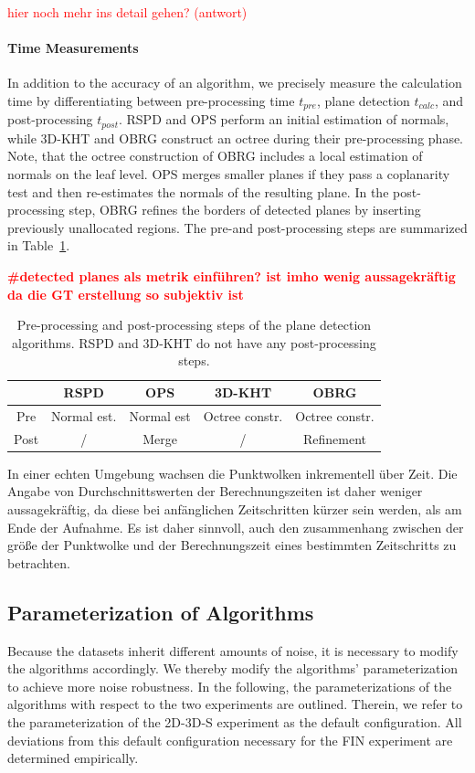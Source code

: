 \documentclass[main.tex]{subfiles}
\begin{document}
\textcolor{red}{hier noch mehr ins detail gehen? (antwort) \underline{\hspace{2cm}}}

\paragraph{Time Measurements}
\label{par:time}
In addition to the accuracy of an algorithm, we precisely measure the calculation time by differentiating between pre-processing time $t_{pre}$, 
plane detection $t_{calc}$, and post-processing $t_{post}$.
RSPD and OPS perform an initial estimation of normals, while 3D-KHT and OBRG construct an octree during their
pre-processing phase. Note, that the octree construction of OBRG includes a local estimation of normals on the
leaf level. OPS merges smaller planes if they pass a coplanarity test and then re-estimates the normals of the
resulting plane. In the post-processing step, OBRG refines the borders of detected planes by inserting
previously unallocated regions.
The pre-and post-processing steps are summarized in Table~\ref{tab:pre-post}.

\textbf{\textcolor{red}{\#detected planes als metrik einführen? ist imho wenig aussagekräftig da die GT erstellung so subjektiv ist}}

\begin{table}[H]
    \centering
    \begin{tabular}{c|cccc}
             & RSPD        & OPS        & 3D-KHT         & OBRG           \\ \hline
        Pre  & Normal est. & Normal est & Octree constr. & Octree constr. \\
        Post & /           & Merge      & /              & Refinement
    \end{tabular}
    \caption{Pre-processing and post-processing steps of the plane detection algorithms. RSPD and 3D-KHT do not have any post-processing steps.}
    \label{tab:pre-post}
\end{table}

In einer echten Umgebung wachsen die Punktwolken inkrementell über Zeit. 
Die Angabe von Durchschnittswerten der Berechnungszeiten ist daher weniger aussagekräftig, da diese bei anfänglichen Zeitschritten 
kürzer sein werden, als am Ende der Aufnahme. Es ist daher sinnvoll, auch den zusammenhang zwischen der größe der Punktwolke 
und der Berechnungszeit eines bestimmten Zeitschritts zu betrachten.


\subsection{Parameterization of Algorithms}
Because the datasets inherit different amounts of noise, it is necessary to modify the algorithms accordingly.
We thereby modify the algorithms' parameterization to achieve more noise robustness.
In the following, the parameterizations of the algorithms with respect to the two experiments are outlined.
Therein, we refer to the parameterization of the 2D-3D-S experiment as the default configuration.
All deviations from this default configuration necessary for the FIN experiment are determined empirically.
\end{document}

